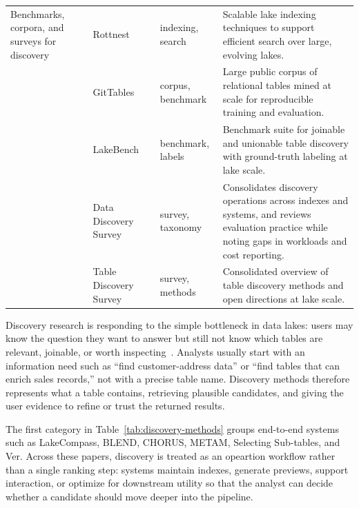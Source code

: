 \documentclass[sigconf]{acmart}
\begin{document}
\begin{table}[!htbp]
\begin{tabularx}{\textwidth}{@{}p{24mm}p{28mm}p{18mm}Y@{}}
\midrule

Benchmarks, corpora, and surveys for discovery &
Rottnest~\cite{11113229} &
indexing, search &
Scalable lake indexing techniques to support efficient search over large, evolving lakes. \\

~ &
GitTables~\cite{10.1145/3588710} &
corpus, benchmark &
Large public corpus of relational tables mined at scale for reproducible training and evaluation. \\

~ &
LakeBench~\cite{10.14778/3659437.3659448} &
benchmark, labels &
Benchmark suite for joinable and unionable table discovery with ground-truth labeling at lake scale. \\

~ &
Data Discovery Survey~\cite{10.14778/3750601.3750694} &
survey, taxonomy &
Consolidates discovery operations across indexes and systems, and reviews evaluation practice while noting gaps in workloads and cost reporting. \\

~ &
Table Discovery Survey~\cite{10.1145/3555041.3589409} &
survey, methods &
Consolidated overview of table discovery methods and open directions at lake scale. \\

\bottomrule
\end{tabularx}
\end{table}

Discovery research is responding to the simple bottleneck in data lakes: users may know the question they want to answer but still not know which tables are relevant, joinable, or worth inspecting~\cite{10.14778/3750601.3750694,10.1145/3555041.3589409}. Analysts usually start with an information need such as ``find customer-address data'' or ``find tables that can enrich sales records,'' not with a precise table name. Discovery methods therefore represents what a table contains, retrieving plausible candidates, and giving the user evidence to refine or trust the returned results.

The first category in Table~\ref{tab:discovery-methods} groups end-to-end systems such as LakeCompass, BLEND, CHORUS, METAM, Selecting Sub-tables, and Ver. Across these papers, discovery is treated as an opeartion workflow rather than a single ranking step: systems maintain indexes, generate previews, support interaction, or optimize for downstream utility so that the analyst can decide whether a candidate should move deeper into the pipeline.
\end{document}
